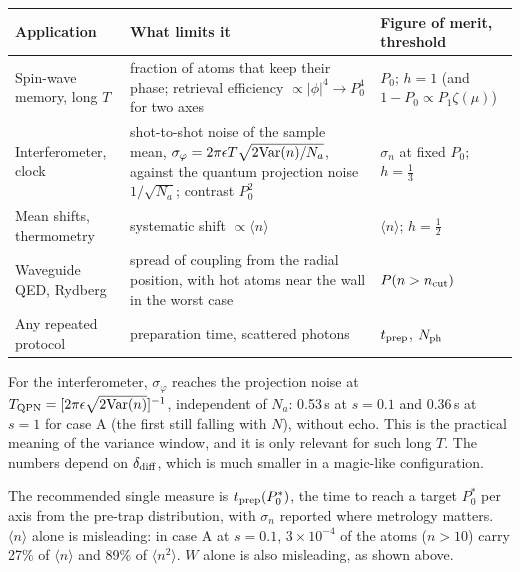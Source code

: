 \documentclass[11pt,a4paper]{article}
\begin{document}
\begin{center}\small
\begin{tabularx}{\textwidth}{@{}lXl@{}}
\toprule
Application & What limits it & Figure of merit, threshold\\
\midrule
Spin-wave memory, long $T$ & fraction of atoms that keep their phase; retrieval efficiency $\propto|\phi|^4\to P_0^4$ for two axes & $P_0$; $h=1$ (and $1-P_0\propto P_1\zeta(\mu)$)\\
Interferometer, clock & shot-to-shot noise of the sample mean, $\sigma_\varphi=2\pi\epsilon T\sqrt{2{\rm Var}(n)/N_a}$, against the quantum projection noise $1/\sqrt{N_a}$; contrast $P_0^2$ & $\sigma_n$ at fixed $P_0$; $h=\tfrac13$\\
Mean shifts, thermometry & systematic shift $\propto\langle n\rangle$ & $\langle n\rangle$; $h=\tfrac12$\\
Waveguide QED, Rydberg & spread of coupling from the radial position, with hot atoms near the wall in the worst case & $P(n>n_{\rm cut})$\\
Any repeated protocol & preparation time, scattered photons & $t_{\rm prep}$, $N_{\rm ph}$\\
\bottomrule
\end{tabularx}
\end{center}

For the interferometer, $\sigma_\varphi$ reaches the projection noise at $T_{\rm QPN}=[2\pi\epsilon\sqrt{2{\rm Var}(n)}]^{-1}$, independent of $N_a$: 0.53\,s at $s=0.1$ and 0.36\,s at $s=1$ for case A (the first still falling with $N$), without echo. This is the practical meaning of the variance window, and it is only relevant for such long $T$. The numbers depend on $\delta_{\rm diff}$, which is much smaller in a magic-like configuration.

The recommended single measure is $t_{\rm prep}(P_0^\ast)$, the time to reach a target $P_0^\ast$ per axis from the pre-trap distribution, with $\sigma_n$ reported where metrology matters. $\langle n\rangle$ alone is misleading: in case A at $s=0.1$, $3\times10^{-4}$ of the atoms ($n>10$) carry 27\% of $\langle n\rangle$ and 89\% of $\langle n^2\rangle$. $W$ alone is also misleading, as shown above.
\end{document}
